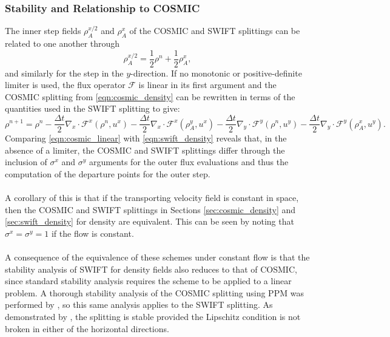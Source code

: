 \documentclass[11pt,a4paper]{article}
\begin{document}
\subsubsection{Stability and Relationship to COSMIC}
The inner step fields $\rho_A^{x/2}$ and $\rho_A^{x}$ of the COSMIC and SWIFT splittings can be related to one another through
\begin{equation}
\rho_A^{x/2} = \frac{1}{2}\rho^n + \frac{1}{2}\rho_A^x,
\end{equation}
and similarly for the step in the $y$-direction.
If no monotonic or positive-definite limiter is used, the flux operator $\mathcal{F}$ is linear in its first argument and the COSMIC splitting from \eqref{eqn:cosmic_density} can be rewritten in terms of the quantities used in the SWIFT splitting to give:
\begin{equation} \label{eqn:cosmic_linear}
\rho^{n+1} = \rho^n - \frac{\Delta t}{2} \nabla_x\cdot \mathcal{F}^x(\rho^n, u^x) - \frac{\Delta{t}}{2} \nabla_x\cdot \mathcal{F}^x(\rho^y_A, u^x)
- \frac{\Delta{t}}{2} \nabla_y\cdot \mathcal{F}^y(\rho^n, u^y) - \frac{\Delta{t}}{2} \nabla_y\cdot \mathcal{F}^y(\rho^x_A, u^y).
\end{equation}
Comparing \eqref{eqn:cosmic_linear} with \eqref{eqn:swift_density} reveals that, in the absence of a limiter, the COSMIC and SWIFT splittings differ through the inclusion of $\sigma^x$ and $\sigma^y$ arguments for the outer flux evaluations and thus the computation of the departure points for the outer step.
\\
\\
A corollary of this is that if the transporting velocity field is constant in space, then the COSMIC and SWIFT splittings in Sections \ref{sec:cosmic_density} and \ref{sec:swift_density} for density are equivalent.
This can be seen by noting that $\sigma^x=\sigma^y=1$ if the flow is constant. \\
\\
A consequence of the equivalence of these schemes under constant flow is that the stability analysis of SWIFT for density fields also reduces to that of COSMIC, since standard stability analysis requires the scheme to be applied to a linear problem.
A thorough stability analysis of the COSMIC splitting using PPM was performed by \citet{lauritzen2007fvstab}, so this same analysis applies to the SWIFT splitting.
As demonstrated by \citet{lin1996ffsl}, the splitting is stable provided the Lipschitz condition is not broken in either of the horizontal directions. \\
\end{document}
